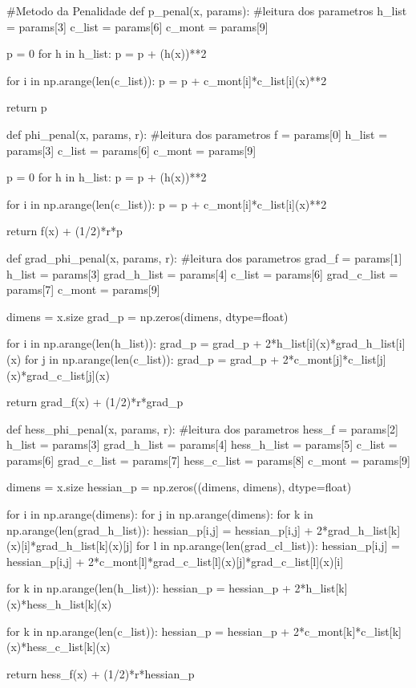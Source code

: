 \documentclass[10pt, a4paper]{article}
\begin{document}
\vspace{3mm}
\begin{python}
  #Metodo da Penalidade
  def p_penal(x, params):
      #leitura dos parametros
      h_list = params[3]
      c_list = params[6]
      c_mont = params[9]
      
      p = 0
      for h in h_list:
          p = p + (h(x))**2
      
      for i in np.arange(len(c_list)):
          p = p + c_mont[i]*c_list[i](x)**2
          
      return  p

  def phi_penal(x, params, r):
      #leitura dos parametros
      f = params[0]
      h_list = params[3]
      c_list = params[6]
      c_mont = params[9]
      
      p = 0
      for h in h_list:
          p = p + (h(x))**2
      
      for i in np.arange(len(c_list)):
          p = p + c_mont[i]*c_list[i](x)**2
          
      return f(x) + (1/2)*r*p

  def grad_phi_penal(x, params, r):
      #leitura dos parametros
      grad_f = params[1]
      h_list = params[3]
      grad_h_list = params[4]
      c_list = params[6]
      grad_c_list = params[7]
      c_mont = params[9]
      
      dimens = x.size
      grad_p = np.zeros(dimens, dtype=float)
      
      for i in np.arange(len(h_list)):
          grad_p = grad_p + 2*h_list[i](x)*grad_h_list[i](x)
      for j in np.arange(len(c_list)):
          grad_p = grad_p + 2*c_mont[j]*c_list[j](x)*grad_c_list[j](x)
          
      return grad_f(x) + (1/2)*r*grad_p

  def hess_phi_penal(x, params, r):
      #leitura dos parametros
      hess_f = params[2]
      h_list = params[3]
      grad_h_list = params[4]
      hess_h_list = params[5]
      c_list = params[6]
      grad_c_list = params[7]
      hess_c_list = params[8]
      c_mont = params[9]    
      
      dimens = x.size    
      hessian_p = np.zeros((dimens, dimens), dtype=float)
      
      for i in np.arange(dimens):    
          for j in np.arange(dimens):
              for k in np.arange(len(grad_h_list)):
                  hessian_p[i,j] = hessian_p[i,j] + 2*grad_h_list[k](x)[i]*grad_h_list[k](x)[j]
              for l in np.arange(len(grad_cl_list)):
                  hessian_p[i,j] = hessian_p[i,j] + 2*c_mont[l]*grad_c_list[l](x)[j]*grad_c_list[l](x)[i]
      
      for k in np.arange(len(h_list)):
          hessian_p = hessian_p + 2*h_list[k](x)*hess_h_list[k](x)
      
      for k in np.arange(len(c_list)):
          hessian_p = hessian_p + 2*c_mont[k]*c_list[k](x)*hess_c_list[k](x)
      
      return hess_f(x) + (1/2)*r*hessian_p
\end{python}
\end{document}

